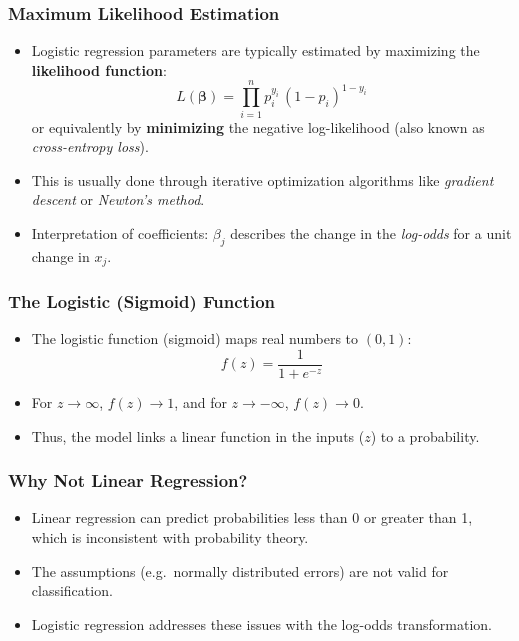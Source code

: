 \documentclass[aspectratio=169]{beamer}
\begin{document}
\begin{frame}
    \frametitle{Maximum Likelihood Estimation}
    \begin{itemize}
        \item Logistic regression parameters are typically estimated by maximizing the \textbf{likelihood function}:
        \[
            L(\boldsymbol{\beta}) = \prod_{i=1}^n p_i^{y_i} \, (1 - p_i)^{1-y_i}
        \]
        or equivalently by \textbf{minimizing} the negative log-likelihood (also known as \emph{cross-entropy loss}).
        \item This is usually done through iterative optimization algorithms like \emph{gradient descent} or \emph{Newton's method}.
        \item Interpretation of coefficients: $\beta_j$ describes the change in the \emph{log-odds} for a unit change in $x_j$.
    \end{itemize}
\end{frame}

\begin{frame}
    \frametitle{The Logistic (Sigmoid) Function}
    \begin{itemize}
        \item The logistic function (sigmoid) maps real numbers to $(0,1)$:
        \[
            f(z) = \frac{1}{1 + e^{-z}}
        \]
        \item For $z \rightarrow \infty$, $f(z) \rightarrow 1$, and for $z \rightarrow -\infty$, $f(z) \rightarrow 0$.
        \item Thus, the model links a linear function in the inputs ($z$) to a probability.
    \end{itemize}
\end{frame}

\begin{frame}
    \frametitle{Why Not Linear Regression?}
    \begin{itemize}
        \item Linear regression can predict probabilities less than 0 or greater than 1, which is inconsistent with probability theory.
        \item The assumptions (e.g.\ normally distributed errors) are not valid for classification.
        \item Logistic regression addresses these issues with the log-odds transformation.
    \end{itemize}
\end{frame}
\end{document}
